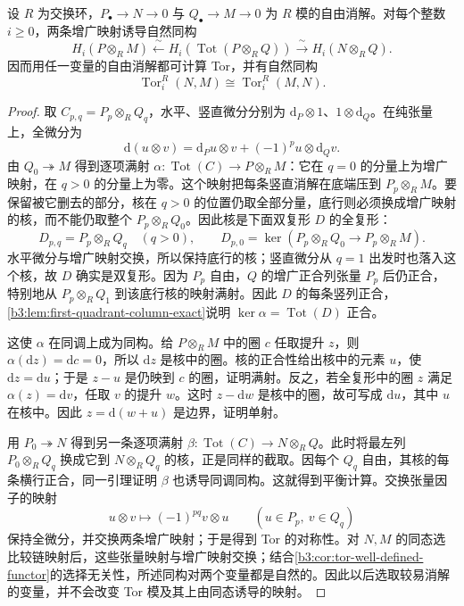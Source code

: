 \begin{lemma}\label{b3:lem:tor-balanced-computation}
	设 \(R\) 为交换环，\(P_\bullet\rightarrow N\rightarrow0\) 与 \(Q_\bullet\rightarrow M\rightarrow0\) 为 \(R\) 模的自由消解。对每个整数 \(i\ge0\)，两条增广映射诱导自然同构
	\[
		H_i(P\otimes_RM) \xleftarrow{\ \sim\ }H_i(\operatorname{Tot}(P\otimes_RQ)) \xrightarrow{\ \sim\ }H_i(N\otimes_RQ).
	\]
	因而用任一变量的自由消解都可计算 Tor，并有自然同构
	\[
		\operatorname{Tor}_i^R(N,M)\cong\operatorname{Tor}_i^R(M,N).
	\]
\end{lemma}
\begin{proof}
	取 \(C_{p,q}=P_p\otimes_RQ_q\)，水平、竖直微分分别为 \(\mathrm{d}_P\otimes1\)、\(1\otimes\mathrm{d}_Q\)。在纯张量上，全微分为
	\[
		\mathrm{d}(u\otimes v)=\mathrm{d}_Pu\otimes v+(-1)^p u\otimes\mathrm{d}_Qv.
	\]
	由 \(Q_0\twoheadrightarrow M\) 得到逐项满射 \(\alpha:\operatorname{Tot}(C)\rightarrow P\otimes_RM\)：它在 \(q=0\) 的分量上为增广映射，在 \(q>0\) 的分量上为零。这个映射把每条竖直消解在底端压到 \(P_p\otimes_RM\)。要保留被它删去的部分，核在 \(q>0\) 的位置仍取全部分量，底行则必须换成增广映射的核，而不能仍取整个 \(P_p\otimes_RQ_0\)。因此核是下面双复形 \(D\) 的全复形：
	\[
		D_{p,q}=P_p\otimes_RQ_q\quad(q>0), \qquad D_{p,0}=\ker(P_p\otimes_RQ_0\longrightarrow P_p\otimes_RM).
	\]
	水平微分与增广映射交换，所以保持底行的核；竖直微分从 \(q=1\) 出发时也落入这个核，故 \(D\) 确实是双复形。因为 \(P_p\) 自由，\(Q\) 的增广正合列张量 \(P_p\) 后仍正合，特别地从 \(P_p\otimes_RQ_1\) 到该底行核的映射满射。因此 \(D\) 的每条竖列正合，\cref{b3:lem:first-quadrant-column-exact}说明 \(\ker\alpha=\operatorname{Tot}(D)\) 正合。

	这使 \(\alpha\) 在同调上成为同构。给 \(P\otimes_RM\) 中的圈 \(c\) 任取提升 \(z\)，则 \(\alpha(\mathrm{d}z)=\mathrm{d}c=0\)，所以 \(\mathrm{d}z\) 是核中的圈。核的正合性给出核中的元素 \(u\)，使 \(\mathrm{d}z=\mathrm{d}u\)；于是 \(z-u\) 是仍映到 \(c\) 的圈，证明满射。反之，若全复形中的圈 \(z\) 满足 \(\alpha(z)=\mathrm{d}v\)，任取 \(v\) 的提升 \(w\)。这时 \(z-\mathrm{d}w\) 是核中的圈，故可写成 \(\mathrm{d}u\)，其中 \(u\) 在核中。因此 \(z=\mathrm{d}(w+u)\) 是边界，证明单射。

	用 \(P_0\twoheadrightarrow N\) 得到另一条逐项满射 \(\beta:\operatorname{Tot}(C)\rightarrow N\otimes_RQ\)。此时将最左列 \(P_0\otimes_RQ_q\) 换成它到 \(N\otimes_RQ_q\) 的核，正是同样的截取。因每个 \(Q_q\) 自由，其核的每条横行正合，同一引理证明 \(\beta\) 也诱导同调同构。这就得到平衡计算。交换张量因子的映射
	\[
		u\otimes v\longmapsto(-1)^{pq}v\otimes u \qquad(u\in P_p,\ v\in Q_q)
	\]
	保持全微分，并交换两条增广映射；于是得到 Tor 的对称性。对 \(N,M\) 的同态选比较链映射后，这些张量映射与增广映射交换；结合\cref{b3:cor:tor-well-defined-functor}的选择无关性，所述同构对两个变量都是自然的。因此以后选取较易消解的变量，并不会改变 Tor 模及其上由同态诱导的映射。
\end{proof}

